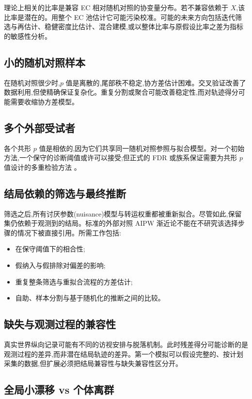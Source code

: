 \documentclass[11pt]{article}
\begin{document}
理论上相关的比率是兼容 EC 相对随机对照的协变量分布。若不兼容依赖于 $X$,该比率是潜在的。用整个 EC 池估计它可能污染校准。可能的未来方向包括迭代筛选与再估计、稳健密度比估计、混合建模,或以整体比率与原假设比率之差为指标的敏感性分析。

\subsection{小的随机对照样本}

在随机对照很少时,$p$ 值是离散的,尾部秩不稳定,协方差估计困难。交叉验证改善了数据利用,但使精确保证复杂化。重复分割或聚合可能改善稳定性,而对轨迹得分可能需要收缩协方差模型。

\subsection{多个外部受试者}

各个共形 $p$ 值是相依的,因为它们共享同一随机对照参照与拟合模型。对一个初始方法,一个保守的诊断阈值或许可以接受;但正式的 FDR 或族系保证需要为共形 $p$ 值设计的多重检验方法 \citep{bates2023outliers,jin2026weighted}。

\subsection{结局依赖的筛选与最终推断}

筛选之后,所有讨厌参数(nuisance)模型与转运权重都被重新拟合。尽管如此,保留集仍依赖于观测到的结局。标准的外部对照 AIPW 渐近论不能在不研究该选择步骤的情况下被直接引用。所需工作包括:
\begin{itemize}
    \item 在保守阈值下的相合性;
    \item 假纳入与假排除对偏差的影响;
    \item 重复整条筛选与重拟合流程的方差估计;
    \item 自助、样本分割与基于随机化的推断之间的比较。
\end{itemize}

\subsection{缺失与观测过程的兼容性}

真实世界纵向记录可能有不同的访视安排与脱落机制。此时残差得分可能诊断的是观测过程的差异,而非潜在结局轨迹的差异。第一个模拟可以假设完整的、按计划采集的数据,但扩展必须把结局兼容性与缺失兼容性区分开。

\subsection{全局小漂移 vs 个体离群}
\end{document}
